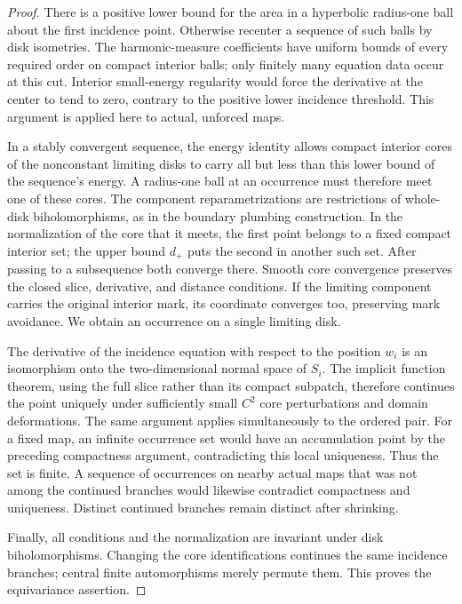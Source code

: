 \documentclass[11pt]{article}
\theoremstyle{definition}
\theoremstyle{remark}
\numberwithin{equation}{section}
\begin{document}
\begin{proof}
There is a positive lower bound for the area in a hyperbolic radius-one
ball about the first incidence point.  Otherwise recenter a sequence of
such balls by disk isometries.  The harmonic-measure coefficients have
uniform bounds of every required order on compact interior balls; only
finitely many equation data occur at this cut.  Interior small-energy
regularity would force the derivative at the center to tend to zero,
contrary to the positive lower incidence threshold.  This argument is
applied here to actual, unforced maps.

In a stably convergent sequence, the energy identity allows compact
interior cores of the nonconstant limiting disks to carry all but less
than this lower bound of the sequence's energy.  A radius-one ball at an
occurrence must therefore meet one of these cores.  The component
reparametrizations are restrictions of whole-disk biholomorphisms, as in
the boundary plumbing construction.  In the normalization of the core
that it meets, the first point belongs to a fixed compact interior set;
the upper bound $d_+$ puts the second in another such set.  After passing
to a subsequence both converge there.  Smooth core convergence preserves
the closed slice, derivative, and distance conditions.  If the limiting
component carries the original interior mark, its coordinate converges
too, preserving mark avoidance.  We obtain an occurrence on a single
limiting disk.

The derivative of the incidence equation with respect to the position
$w_i$ is an isomorphism onto the two-dimensional normal space of $S_i$.
The implicit function theorem, using the full slice rather than its
compact subpatch, therefore continues the point uniquely under
sufficiently small $C^2$ core perturbations and domain deformations.
The same argument applies simultaneously to the ordered pair.  For a
fixed map, an infinite occurrence set would have an accumulation point
by the preceding compactness argument, contradicting this local
uniqueness.  Thus the set is finite.  A sequence of occurrences on nearby
actual maps that was not among the continued branches would likewise
contradict compactness and uniqueness.  Distinct continued branches
remain distinct after shrinking.

Finally, all conditions and the normalization are invariant under disk
biholomorphisms.  Changing the core identifications continues the same
incidence branches; central finite automorphisms merely permute them.
This proves the equivariance assertion.
\end{proof}
\end{document}
